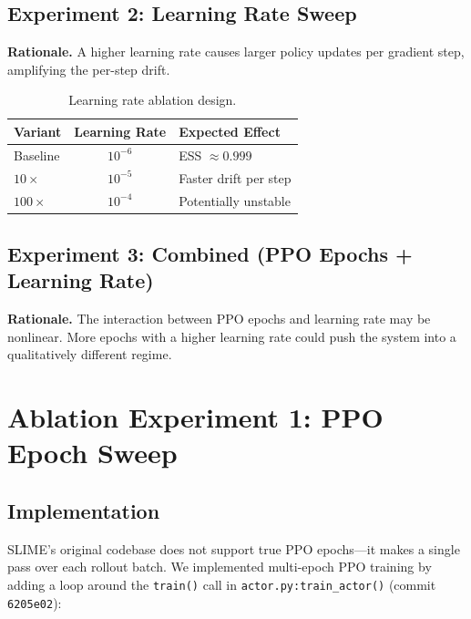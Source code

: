\documentclass[11pt,a4paper]{article}
\begin{document}
\subsection{Experiment 2: Learning Rate Sweep}

\textbf{Rationale.} A higher learning rate causes larger policy updates per
gradient step, amplifying the per-step drift.

\begin{table}[H]
\centering
\caption{Learning rate ablation design.}
\label{tab:lr_sweep}
\begin{tabular}{@{}lcl@{}}
\toprule
\textbf{Variant} & \textbf{Learning Rate} & \textbf{Expected Effect} \\
\midrule
Baseline     & $10^{-6}$ & ESS $\approx 0.999$ \\
$10\times$   & $10^{-5}$ & Faster drift per step \\
$100\times$  & $10^{-4}$ & Potentially unstable \\
\bottomrule
\end{tabular}
\end{table}

\subsection{Experiment 3: Combined (PPO Epochs + Learning Rate)}

\textbf{Rationale.} The interaction between PPO epochs and learning rate may be
nonlinear. More epochs with a higher learning rate could push the system into
a qualitatively different regime.


\section{Ablation Experiment 1: PPO Epoch Sweep}
\label{sec:ppo_epoch_results}

\subsection{Implementation}

SLIME's original codebase does not support true PPO epochs---it makes a single
pass over each rollout batch. We implemented multi-epoch PPO training by adding a
loop around the \texttt{train()} call in \texttt{actor.py:train\_actor()}
(commit \texttt{6205e02}):
\end{document}
